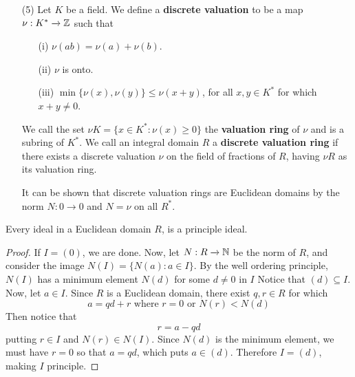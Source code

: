 \begin{example}
\begin{enumerate}
        \item[(5)] Let $K$ be a field. We define a  \textbf{discrete valuation}
            to be a map $\nu:K^\ast \xrightarrow{} \mathbb{Z}$ such that
            \begin{enumerate}
                \item[(i)] $\nu(ab)=\nu(a)+\nu(b)$.

                \item[(ii)] $\nu$ is onto.

                \item[(iii)] $\min{\{\nu(x),\nu(y)\}} \leq \nu(x+y)$, for all
                    $x,y \in K^\ast$ for which  $x+y \neq 0$.
            \end{enumerate}
            We call the set $\nu{K}=\{x \in K^\ast : \nu(x) \geq 0\}$ the
            \textbf{valuation ring} of $\nu$ and is a subring of  $K^\ast$. We
            call an integral domain  $R$ a  \textbf{discrete valuation ring} if
            there exists a discrete valuation $\nu$ on the field of fractions of
             $R$, having  $\nu{R}$ as its valuation ring.

             It can be shown that discrete valuation rings are Euclidean
             domains by the norm $N:0 \xrightarrow{} 0$ and $N=\nu$ on all
             $R^\ast$.
    \end{enumerate}
\end{example}

\begin{lemma}\label{2.1.1}
    Every ideal in a Euclidean domain $R$, is a principle ideal.
\end{lemma}
\begin{proof}
    If $I=(0)$, we are done. Now, let $N:R \xrightarrow{} \mathbb{N}$ be the norm of $R$,
    and consider the image $N(I)=\{N(a) : a \in I\}$. By the well ordering
    principle, $N(I)$ has a minimum element $N(d)$ for some $d \neq 0$ in  $I$
    Notice that  $(d) \subseteq I$. Now, let $a \in I$. Since $R$ is a Euclidean
    domain, there exist $q,r \in R$ for which
    \begin{equation*}
        a=qd+r \text{ where } r=0 \text{ or } N(r)<N(d)
    \end{equation*}
    Then notice that
    \begin{equation*}
        r=a-qd
    \end{equation*}
    putting $r \in I$ and  $N(r) \in N(I)$. Since $N(d)$ is the minimum element,
    we must have $r=0$ so that  $a=qd$, which puts  $a \in (d)$. Therefore
    $I=(d)$, making $I$ principle.
\end{proof}

